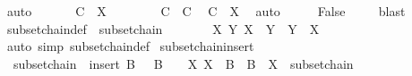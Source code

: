 \begin{isabellebody}
\ auto\isanewline
\ \ \isamarkupfalse%
\ \isamarkupfalse%
\ {\isacharasterisk}{\kern0pt}{\isacharasterisk}{\kern0pt}{\isacharcolon}{\kern0pt}\ {\isachardoublequoteopen}{\isasymUnion}C\ {\isasymnoteq}\ X{\isachardoublequoteclose}\isanewline
\ \ \isamarkupfalse%
\ \isamarkupfalse%
\ {\isacharasterisk}{\kern0pt}{\isacharasterisk}{\kern0pt}\ \isamarkupfalse%
\ {\isachardoublequoteopen}C\ {\isasymsubset}\ {\isacharquery}{\kern0pt}C{\isachardoublequoteclose}\ \isamarkupfalse%
\ {\isacartoucheopen}{\isasymUnion}C\ {\isasymsubseteq}\ X{\isacartoucheclose}\ \isamarkupfalse%
\ auto\isanewline
\ \ \isamarkupfalse%
\ \isamarkupfalse%
\ False\ \isamarkupfalse%
\ {\isacharasterisk}{\kern0pt}\ \isamarkupfalse%
\ blast\isanewline
{}\isamarkupfalse%
%
\endisatagproof
{\isafoldproof}%
%
\isadelimproof
\isanewline
%
\endisadelimproof
\isanewline
{}\isamarkupfalse%
\ subset{\isacharunderscore}{\kern0pt}chain{\isacharunderscore}{\kern0pt}def{\isacharcolon}{\kern0pt}\ {\isachardoublequoteopen}{\isasymAnd}{\isasymA}{\isachardot}{\kern0pt}\ subset{\isachardot}{\kern0pt}chain\ {\isasymA}\ {\isasymC}\ {\isacharequal}{\kern0pt}\ {\isacharparenleft}{\kern0pt}{\isasymC}\ {\isasymsubseteq}\ {\isasymA}\ {\isasymand}\ {\isacharparenleft}{\kern0pt}{\isasymforall}X{\isasymin}{\isasymC}{\isachardot}{\kern0pt}\ {\isasymforall}Y{\isasymin}{\isasymC}{\isachardot}{\kern0pt}\ X\ {\isasymsubseteq}\ Y\ {\isasymor}\ Y\ {\isasymsubseteq}\ X{\isacharparenright}{\kern0pt}{\isacharparenright}{\kern0pt}{\isachardoublequoteclose}\isanewline
%
\isadelimproof
\ \ %
\endisadelimproof
%
\isatagproof
{}\isamarkupfalse%
\ {\isacharparenleft}{\kern0pt}auto\ simp{\isacharcolon}{\kern0pt}\ subset{\isachardot}{\kern0pt}chain{\isacharunderscore}{\kern0pt}def{\isacharparenright}{\kern0pt}%
\endisatagproof
{\isafoldproof}%
%
\isadelimproof
\isanewline
%
\endisadelimproof
\isanewline
{}\isamarkupfalse%
\ subset{\isacharunderscore}{\kern0pt}chain{\isacharunderscore}{\kern0pt}insert{\isacharcolon}{\kern0pt}\isanewline
\ \ {\isachardoublequoteopen}subset{\isachardot}{\kern0pt}chain\ {\isasymA}\ {\isacharparenleft}{\kern0pt}insert\ B\ {\isasymB}{\isacharparenright}{\kern0pt}\ {\isasymlongleftrightarrow}\ B\ {\isasymin}\ {\isasymA}\ {\isasymand}\ {\isacharparenleft}{\kern0pt}{\isasymforall}X{\isasymin}{\isasymB}{\isachardot}{\kern0pt}\ X\ {\isasymsubseteq}\ B\ {\isasymor}\ B\ {\isasymsubseteq}\ X{\isacharparenright}{\kern0pt}\ {\isasymand}\ subset{\isachardot}{\kern0pt}chain\ {\isasymA}\ {\isasymB}{\isachardoublequoteclose}\isanewline

\end{isabellebody}
